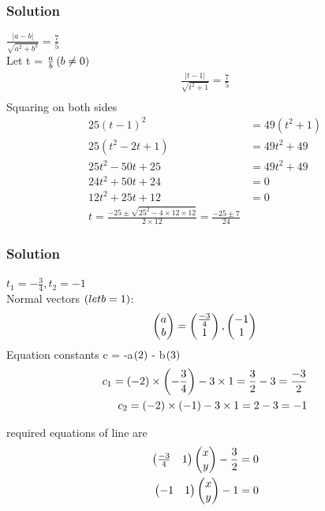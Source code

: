\documentclass{beamer}
\begin{document}
\begin{frame}
\frametitle{Solution}
$\frac{|a - b|}{\sqrt{a^2 + b^2}} = \frac{7}{5}$ \\
Let t = $\frac{a}{b}\left(b \neq 0\right)$ \\
\begin{align}
\frac{|t - 1|}{\sqrt{t^2 + 1}} = \frac{7}{5} \\
\end{align}
Squaring  on both sides
\begin{align}
25 (t - 1)^2 &= 49 (t^2 + 1) \\
25 (t^2 - 2 t + 1) &= 49 t^2 + 49 \\
25 t^2 - 50 t + 25 &= 49 t^2 + 49 \\
24 t^2 + 50 t + 24 &= 0 \\
12 t^2 + 25 t + 12 &= 0 \\
t = \frac{-25\pm \sqrt{25^2-4\times12\times12}}{2\times12} =\frac{-25\pm 7}{24} 
\end{align}
\end{frame}

\begin{frame}
\frametitle{Solution}
$t_1 = -\frac{3}{4},t_2 = -1$ \\
Normal vectors $\left(let b=1\right)$:
\begin{align}
\begin{pmatrix}a \\ b\end{pmatrix} =\begin{pmatrix}\frac{-3}{4} \\ 1\end{pmatrix},\begin{pmatrix}-1 \\ 1\end{pmatrix}
\end{align}
Equation constants \quad c = -a$\left(2\right)$ - b$\left(3\right)$
\begin{align}
c_1 =\left(-2\right)\times\left(-\frac{3}{4}\right) -3\times1 =\frac{3}{2} -3 =\frac{-3}{2} \\
c_2 = \left(-2\right)\times\left(-1\right) - 3\times1 = 2 -3= -1 
\end{align}

required equations of line are  
\begin{align}
\begin{pmatrix}\frac{-3}{4} & 1\end{pmatrix} \begin{pmatrix}x \\ y\end{pmatrix} -\frac{3}{2} = 0 \\
\begin{pmatrix}-1 & 1\end{pmatrix} \begin{pmatrix}x \\ y\end{pmatrix} - 1 = 0 \\
\end{align}
\end{frame}
\end{document}

